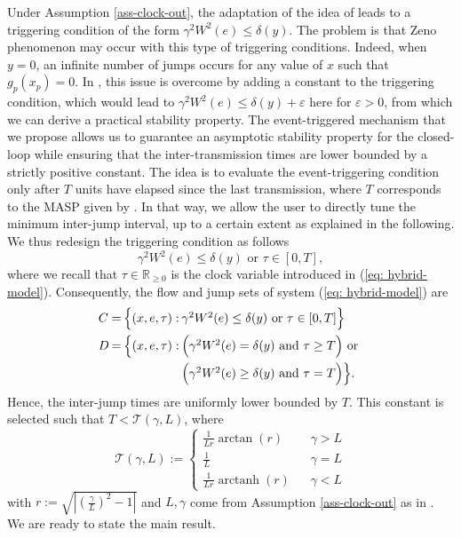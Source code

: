 \documentclass[a4paper, 9pt, twocolumn]{IEEEtran}
\theoremstyle{plain}
\theoremstyle{definition}
\newcommand{\arctanh}{\operatorname{arctanh}}
\newcommand{\R}[2]{\ensuremath{\mathbb{R}^{#1}_{#2}}}
\begin{document}
Under Assumption \ref{ass-clock-out}, the adaptation of the idea of \cite{Tabuada2007event} leads to a triggering condition of the form $\gamma^{2} W^{2}(e) \leq \delta(y)$. The problem is that Zeno phenomenon may occur with this type of triggering conditions. Indeed, when $y=0$, an infinite number of jumps occurs for any value of $x$ such that $g_{p}(x_{p})=0$. In \cite{Donkers2012output}, this issue is overcome by adding a constant to the triggering condition, which would lead to $\gamma^{2} W^{2}(e) \leq \delta(y) + \varepsilon$ here for $\varepsilon > 0$, from which we can derive a practical stability property. The event-triggered mechanism that we propose allows us to guarantee an asymptotic stability property for the closed-loop while ensuring that the inter-transmission times are lower bounded by a strictly positive constant. The idea is to evaluate the event-triggering condition only after $T$ units have elapsed since the last transmission, where $T$ corresponds to the MASP given by \cite{Nesic2009explicit}. In that way, we allow the user to directly tune the minimum inter-jump interval, up to a certain extent as explained in the following. We thus redesign the triggering condition as follows
\begin{equation} \label{eq:tig-condn}
  \gamma^{2} W^{2}(e) \leq \delta(y) \text{ or } \tau \in [0,T],
\end{equation}
where we recall that $\tau\in \R{}{\geq 0}$ is the clock variable introduced in (\ref{eq: hybrid-model}). Consequently, the flow and jump sets of system (\ref{eq: hybrid-model}) are
\begin{equation}\label{flow-jump-sets-out}
\arraycolsep=1pt\def\arraystretch{1.3}
\begin{array}{lcll}
C &=& \Big\{(x,e,\tau): &\gamma^{2} W^{2}(e) \leq \delta(y) \text{ or } \tau \in [0,T]\Big\} \\[6pt]
D &=& \Big\{(x,e,\tau): &\Big(\gamma^{2} W^{2}(e) = \delta(y) \text{ and } \tau \geq T\Big) \text{ or } \\[6pt]
& & & \Big(\gamma^{2} W^{2}(e) \geq \delta(y) \text{ and } \tau = T\Big) \Big\}.
\end{array}
\end{equation}
Hence, the inter-jump times are uniformly lower bounded by $T$. This constant is selected such that $T < \mathcal{T}(\gamma, L)$, where
\begin{equation} \label{T-phi}
\mathcal{T}(\gamma, L) := \left\{
    \begin{array}{ll}
    \frac{1}{Lr}\arctan(r)& \hspace{10pt} \gamma > L \\
    \frac{1}{L}& \hspace{10pt} \gamma = L \\
    \frac{1}{Lr}\arctanh(r)& \hspace{10pt} \gamma < L
    \end{array}
    \right.
\end{equation}
with $r := \sqrt{\left|(\frac{\gamma}{L})^{2} - 1\right|}$ and $L,\gamma$ come from Assumption \ref{ass-clock-out} as in \cite{Nesic2009explicit}. We are ready to state the main result.
\end{document}
